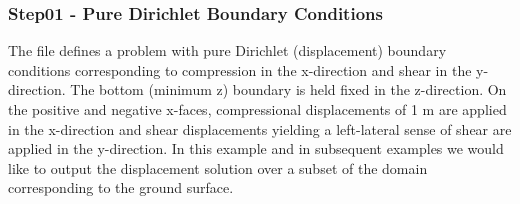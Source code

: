 \subsubsection{Step01 - Pure Dirichlet Boundary Conditions}

The  file defines a problem with pure Dirichlet
(displacement) boundary conditions corresponding to compression in the
x-direction and shear in the y-direction. The bottom (minimum z)
boundary is held fixed in the z-direction. On the positive and
negative x-faces, compressional displacements of 1 m are applied in
the x-direction and shear displacements yielding a left-lateral sense
of shear are applied in the y-direction. In this example and in
subsequent examples we would like to output the displacement solution
over a subset of the domain corresponding to the ground surface.


